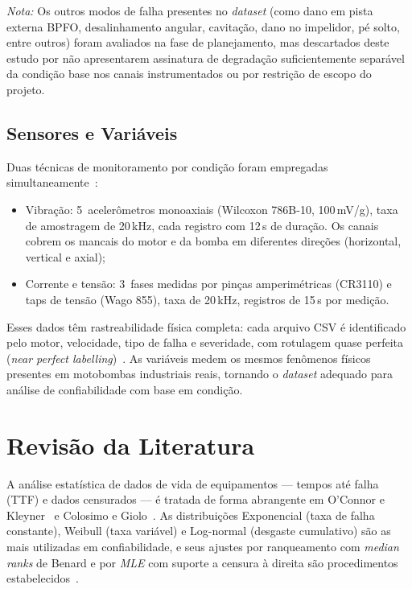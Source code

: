 \documentclass[conference]{IEEEtran}
\begin{document}
\textit{Nota:} Os outros modos de falha presentes no \textit{dataset} (como 
dano em pista externa BPFO, desalinhamento angular, cavitação, dano no 
impelidor, pé solto, entre outros) foram avaliados na fase de planejamento, 
mas descartados deste estudo por não apresentarem assinatura de degradação 
suficientemente separável da condição base nos canais instrumentados ou 
por restrição de escopo do projeto.

\subsection{Sensores e Variáveis}

Duas técnicas de monitoramento por condição foram empregadas
simultaneamente~\cite{bruinsma2024}:

\begin{itemize}
    \item Vibração: 5~acelerômetros monoaxiais (Wilcoxon
    786B-10, 100\,mV/g), taxa de amostragem de 20\,kHz, cada
    registro com 12\,s de duração. Os canais cobrem os mancais
    do motor e da bomba em diferentes direções (horizontal,
    vertical e axial);
    \item Corrente e tensão: 3~fases medidas por pinças
    amperimétricas (CR3110) e taps de tensão (Wago 855), taxa de
    20\,kHz, registros de 15\,s por medição.
\end{itemize}

Esses dados têm rastreabilidade física completa: cada arquivo CSV é
identificado pelo motor, velocidade, tipo de falha e severidade, com
rotulagem quase perfeita (\textit{near perfect labelling})~\cite{bruinsma2024}. As variáveis medem os mesmos
fenômenos físicos presentes em motobombas industriais reais, tornando
o \textit{dataset} adequado para análise de confiabilidade com base em condição.

\section{Revisão da Literatura}

A análise estatística de dados de vida de equipamentos --- tempos até
falha (TTF) e dados censurados --- é tratada de forma abrangente em
O'Connor e Kleyner~\cite{oconnor2012} e Colosimo e
Giolo~\cite{colosimo2006}. As distribuições Exponencial (taxa de falha
constante), Weibull (taxa variável) e Log-normal (desgaste cumulativo)
são as mais utilizadas em confiabilidade, e seus ajustes por
ranqueamento com \textit{median ranks} de Benard e por \textit{MLE} com suporte
a censura à direita são procedimentos estabelecidos~\cite{oconnor2012}.
\end{document}
